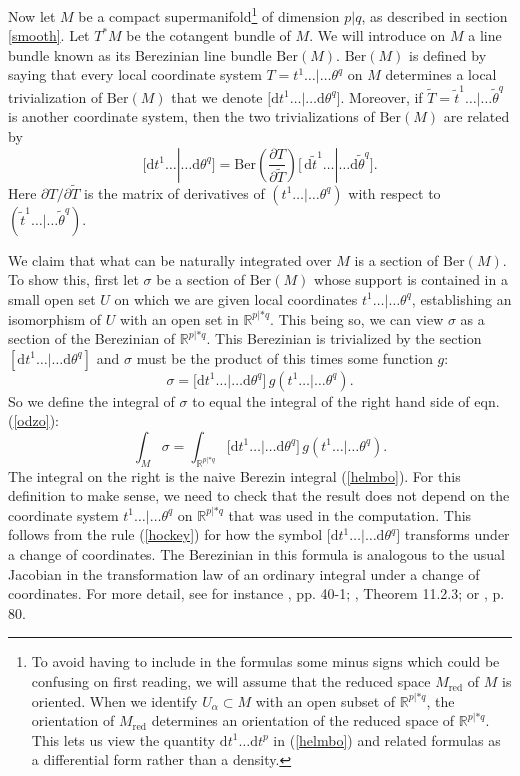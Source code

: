 \documentclass[11pt,a4paper]{article}
\def\t{{ \sf t}}
\def\tilde{\widetilde}
\def\red{{\mathrm{red}}}
\def\d{{\mathrm d}}
\def\R{{\mathbb R}}
\def\[{\bigl [}
\def\]{\bigr ]}
\def\t{\tilde }
\def\tilde{\widetilde}
\def\Ber{{\mathrm {Ber}}}
\begin{document}
Now let $M$ be a compact supermanifold\footnote{To avoid having to include in the formulas some minus signs  which could be confusing on first
reading, we will assume that the reduced space $M_\red$ of $M$ is oriented.    When we identify $U_\alpha\subset M$ with an open
subset of $\R^{p|* q}$, the orientation of $M_\red$ determines an orientation of the reduced space of $\R^{p|*q}$. 
This lets us view the quantity $\d t^1\dots \d t^p$ in
(\ref{helmbo}) and related formulas as a differential form rather than a density.}  of dimension $p|q$, as described in section 
\ref{smooth}.  Let $T^*M$ be the cotangent bundle of $M$.  We will introduce on $M$ a line bundle known
as its Berezinian line bundle $\Ber(M)$.    $\Ber(M)$ is defined by saying that every local coordinate
system $T=t^1\dots|\dots\theta^q$ on $M$ determines a local trivialization of $\Ber(M)$ that we denote $\[\d t^1\dots|\dots\d\theta^q\]$.
Moreover, if $\t T=\t t^1 \dots|\dots \t \theta^q$ is another coordinate system, then the two trivializations of $\Ber(M)$ are related by
\begin{equation}\label{hockey}\[\d  t^1\dots|\dots\d\theta^q\]=\Ber\left(\frac{\partial  T}{ \partial \t T}\right) \[\,\d\t t^1\dots|\dots\d\t \theta^q\].\end{equation}
Here $\partial T/\partial\t T$ is the matrix of derivatives of $( t^1\dots|\dots \theta^q) $ with respect to $(\t t^1\dots|\dots\t\theta^q)$.

We claim that what can be naturally integrated over $M$ is a section of $\Ber(M)$.  To show this, first let $\sigma$ be a section of $\Ber(M)$
whose support is contained in a small open set $U$ on which we are given local coordinates $t^1\dots|\dots\theta^q$, establishing
an isomorphism of $U$ with an open set in $\R^{p|*q}$.  This being so,  we can view $\sigma$ as a section of the Berezinian of $\R^{p|*q}$. This
Berezinian is trivialized by the section $[\d t^1\dots|\dots \d\theta^q]$ and $\sigma$ must be the product of this times some function $g$:
\begin{equation}\label{odzo}\sigma=[\d t^1\dots|\dots\d \theta^q\]\,g(t^1\dots|\dots\theta^q).\end{equation}
So we define the integral of $\sigma$ to equal the integral of the right hand side of eqn. (\ref{odzo}):\begin{equation}\label{helmox}\int_M\sigma=\int_{\R^{p|*q}}\[\d t^1\dots|\dots\d\theta^q\]\,g(t^1\dots|\dots\theta^q).\end{equation}
The integral on the right is the naive Berezin integral (\ref{helmbo}).
For this definition to make sense, we need to check that the result does not depend on the coordinate system $t^1\dots|\dots\theta^q$
on $\R^{p|*q}$ 
that was used in the computation.  This follows from the rule (\ref{hockey}) for how the symbol $\[\d t^1\dots|\dots\d\theta^q\]$ transforms
under a change of coordinates.  The Berezinian in this formula is analogous to the usual Jacobian in the transformation law of an ordinary integral under
a change of coordinates.  For more detail, see for instance \cite{DeWitt}, pp. 40-1; \cite{Rogers}, Theorem 11.2.3; or \cite{DEF}, p. 80.  
\end{document}
